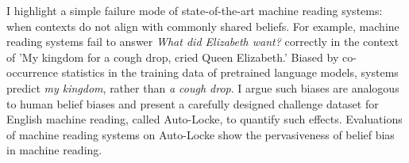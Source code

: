 I highlight a simple failure mode of state-of-the-art machine reading systems: when contexts do not align with commonly shared beliefs. For example, machine reading systems fail to answer {\em What did Elizabeth want?} correctly in the context of 'My kingdom for a cough drop, cried Queen Elizabeth.' Biased by co-occurrence statistics in the training data of pretrained language models, systems predict {\em my kingdom}, rather than {\em a cough drop}. I argue such biases are analogous to human belief biases and present a carefully designed challenge dataset for English machine reading, called {\sc Auto-Locke}, to quantify such effects. Evaluations of machine reading systems on {\sc Auto-Locke} show the pervasiveness of belief bias in machine reading.
